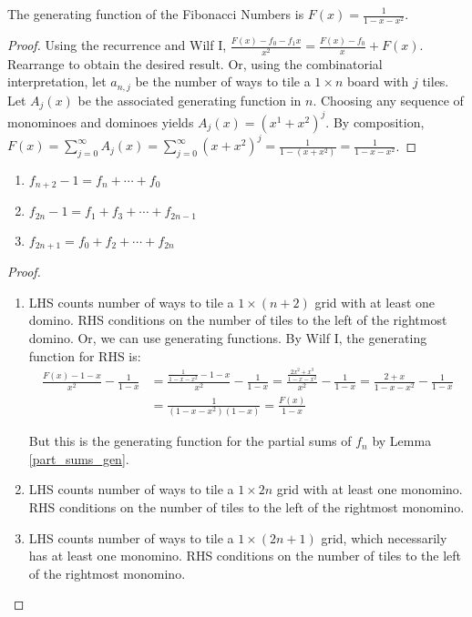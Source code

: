 \documentclass[a4paper]{article}
\begin{document}
\begin{lemma}
The generating function of the Fibonacci Numbers is $\displaystyle F(x)=\frac1{1-x-x^2}$.

\begin{hl}
\begin{proof}
Using the recurrence and Wilf I, $\frac{F(x)-f_0-f_1x}{x^2}=\frac{F(x)-f_0}x+F(x)$. Rearrange to obtain the desired result. Or, using the combinatorial interpretation, let $a_{n,j}$ be the number of ways to tile a $1\times n$ board with $j$ tiles. Let $A_j(x)$ be the associated generating function in $n$. Choosing any sequence of monominoes and dominoes yields $A_j(x)=(x^1+x^2)^j$. By composition, $F(x)=\sum_{j=0}^\infty A_j(x)=\sum_{j=0}^\infty(x+x^2)^j=\frac1{1-(x+x^2)}=\frac1{1-x-x^2}$.
\end{proof}
\end{hl}
\end{lemma}

\begin{lemma}
\;
\begin{enumerate}
\item $f_{n+2}-1=f_n+\cdots+f_0$
\item $f_{2n}-1=f_1+f_3+\cdots+f_{2n-1}$
\item $f_{2n+1}=f_{0}+f_2+\cdots+f_{2n}$
\end{enumerate}

\begin{hl}
\begin{proof}
\;
\begin{enumerate}
\item LHS counts number of ways to tile a $1\times(n+2)$ grid with at least one domino. RHS conditions on the number of tiles to the left of the rightmost domino. Or, we can use generating functions. By Wilf I, the generating function for RHS is:
\begin{align*}
\frac{F(x)-1-x}{x^2}-\frac1{1-x}
&=\frac{\frac1{1-x-x^2}-1-x}{x^2}-\frac1{1-x}
=\frac{\frac{2x^2+x^3}{1-x-x^2}}{x^2}-\frac1{1-x}
=\frac{2+x}{1-x-x^2}-\frac1{1-x}\\
&=\frac{1}{(1-x-x^2)(1-x)}
=\frac{F(x)}{1-x}
\end{align*}

But this is the generating function for the partial sums of $f_n$ by Lemma \ref{part_sums_gen}.
\item LHS counts number of ways to tile a $1\times 2n$ grid with at least one monomino. RHS conditions on the number of tiles to the left of the rightmost monomino.
\item LHS counts number of ways to tile a $1\times (2n+1)$ grid, which necessarily has at least one monomino. RHS conditions on the number of tiles to the left of the rightmost monomino.\qedhere
\end{enumerate}
\end{proof}
\end{hl}
\end{lemma}
\end{document}

